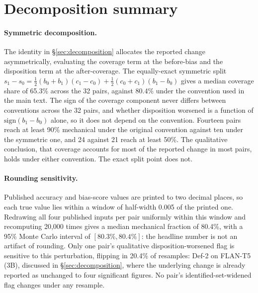 \section{Decomposition summary}
\label{app:decomp}







\paragraph{Symmetric decomposition.} The identity in \S\ref{sec:decomposition}
allocates the reported change asymmetrically, evaluating the coverage term at
the before-bias and the disposition term at the after-coverage. The
equally-exact symmetric split
$s_1-s_0=\tfrac{1}{2}(b_0+b_1)(c_1-c_0)+\tfrac{1}{2}(c_0+c_1)(b_1-b_0)$
gives a median coverage share of 65.3\% across the 32 pairs, against 80.4\%
under the convention used in the main text. The sign of the coverage
component never differs between conventions across the 32 pairs, and whether
disposition worsened is a function of $\mathrm{sign}(b_1-b_0)$ alone, so it
does not depend on the convention. Fourteen pairs reach at least 90\%
mechanical under the original convention against ten under the symmetric one,
and 24 against 21 reach at least 50\%. The qualitative conclusion, that
coverage accounts for most of the reported change in most pairs, holds under
either convention. The exact split point does not.

\paragraph{Rounding sensitivity.} Published accuracy and bias-score values
are printed to two decimal places, so each true value lies within a window
of half-width 0.005 of the printed one. Redrawing all four published inputs
per pair uniformly within this window and recomputing 20,000 times gives a
median mechanical fraction of 80.4\%, with a 95\% Monte Carlo interval of
$[80.3\%, 80.4\%]$: the headline number is not an artifact of rounding.
Only one pair's qualitative disposition-worsened flag is sensitive to this
perturbation, flipping in 20.4\% of resamples: Def-2 on FLAN-T5 (3B),
discussed in \S\ref{sec:decomposition}, where the underlying change is
already reported as unchanged to four significant figures.
No pair's identified-set-widened flag changes under any resample.
